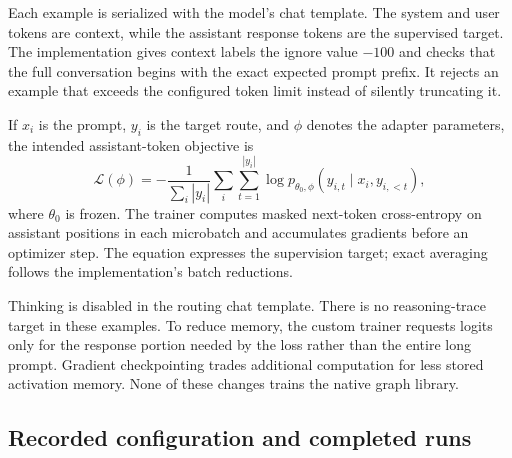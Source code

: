 \documentclass[11pt,a4paper]{article}
\begin{document}
Each example is serialized with the model's chat template. The system and user
tokens are context, while the assistant response tokens are the supervised
target. The implementation gives context labels the ignore value $-100$ and
checks that the full conversation begins with the exact expected prompt prefix.
It rejects an example that exceeds the configured token limit instead of
silently truncating it.

If $x_i$ is the prompt, $y_i$ is the target route, and $\phi$ denotes the adapter
parameters, the intended assistant-token objective is
\begin{equation}
\mathcal{L}(\phi)=
-\frac{1}{\sum_i |y_i|}
\sum_i\sum_{t=1}^{|y_i|}
\log p_{\theta_0,\phi}(y_{i,t}\mid x_i,y_{i,<t}),
\end{equation}
where $\theta_0$ is frozen. The trainer computes masked next-token
cross-entropy on assistant positions in each microbatch and accumulates
gradients before an optimizer step. The equation expresses the supervision
target; exact averaging follows the implementation's batch reductions.

Thinking is disabled in the routing chat template. There is no reasoning-trace
target in these examples. To reduce memory, the custom trainer requests logits
only for the response portion needed by the loss rather than the entire long
prompt. Gradient checkpointing trades additional computation for less stored
activation memory. None of these changes trains the native graph library.

\subsection{Recorded configuration and completed runs}
\end{document}
